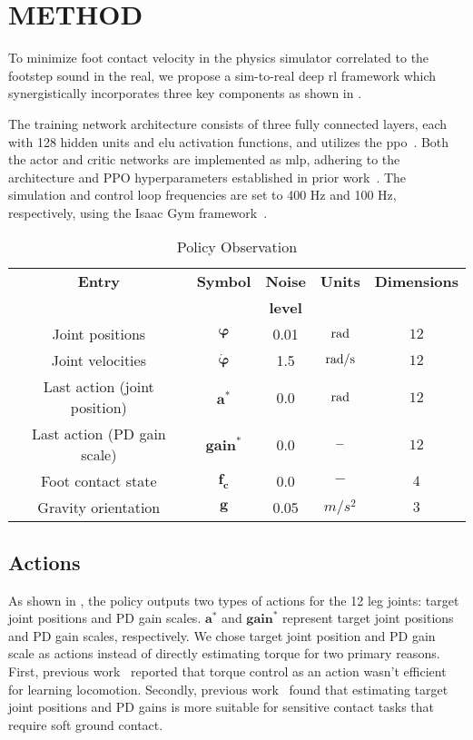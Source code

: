 \section{METHOD}
To minimize foot contact velocity in the physics simulator correlated to the footstep sound in the real, we propose a sim-to-real deep \ac{rl} framework which synergistically incorporates three key components as shown in .

The training network architecture consists of three fully connected layers, each with 128 hidden units and \ac{elu} activation functions, and utilizes the \ac{ppo}~\cite{ppo}.
Both the actor and critic networks are implemented as \ac{mlp}, adhering to the architecture and PPO hyperparameters established in prior work~\cite{legged_gym}.
The simulation and control loop frequencies are set to 400 Hz and 100 Hz, respectively, using the Isaac Gym framework~\cite{Makoviychuk2021-th}.

\begin{table}
\caption{Policy Observation}
\label{table:observation}
\begin{center}
\begin{tabular}{ccccc}
\toprule
\textbf{Entry} & \textbf{Symbol} & \textbf{Noise} & \textbf{Units} & \textbf{Dimensions} \\
 & &  \textbf{level}\\
\midrule
Joint positions & $\boldsymbol{\varphi}$ & 0.01 & $\rm{rad}$ & $12$ \\
Joint velocities & $\boldsymbol{\dot{\varphi}}$ & 1.5 & $\rm{rad/s}$ & $12$ \\
Last action (joint position) & $\boldsymbol{a}^*$ & 0.0 & $\rm{rad}$ & $12$\\
Last action (PD gain scale) & $\boldsymbol{gain}^*$ & 0.0 & $\rm{-}$ & $12$\\
Foot contact state & $\boldsymbol{f_c}$ & 0.0 & $-$ & $4$\\
Gravity orientation & $\boldsymbol{g}$ & 0.05 & $m/s^2$ & $3$\\
\bottomrule
\end{tabular}
\end{center}
\end{table}

\subsection{Actions}
As shown in , the policy outputs two types of actions for the 12 leg joints: target joint positions and PD gain scales. $\boldsymbol{a}^*$ and $\boldsymbol{gain}^*$ represent target joint positions and PD gain scales, respectively. 
We chose target joint position and PD gain scale as actions instead of directly estimating torque for two primary reasons. First, previous work~\cite{peng2017learning} reported that torque control as an action wasn't efficient for learning locomotion. Secondly, previous work~\cite{bogdanovic2020learning} found that estimating target joint positions and PD gains is more suitable for sensitive contact tasks that require soft ground contact.

